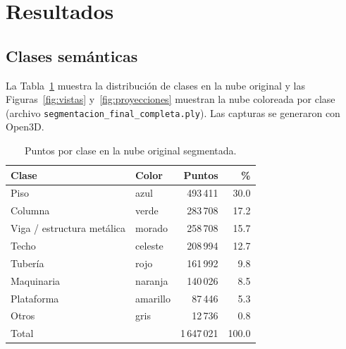 \documentclass[11pt,a4paper]{article}
\begin{document}
\section{Resultados}

\subsection{Clases semánticas}

La Tabla~\ref{tab:conteo} muestra la distribución de clases en la nube original
y las Figuras~\ref{fig:vistas} y~\ref{fig:proyecciones} muestran la nube
coloreada por clase (archivo \texttt{segmentacion\_final\_completa.ply}). Las
capturas se generaron con Open3D.

\begin{table}[H]
  \centering
  \begin{tabular}{llrr}
    \toprule
    Clase & Color & Puntos & \% \\
    \midrule
    Piso                       & azul     & 493\,411 & 30.0 \\
    Columna                    & verde    & 283\,708 & 17.2 \\
    Viga / estructura metálica & morado   & 258\,708 & 15.7 \\
    Techo                      & celeste  & 208\,994 & 12.7 \\
    Tubería                    & rojo     & 161\,992 &  9.8 \\
    Maquinaria                 & naranja  & 140\,026 &  8.5 \\
    Plataforma                 & amarillo &  87\,446 &  5.3 \\
    Otros                      & gris     &  12\,736 &  0.8 \\
    \midrule
    Total                      &          & 1\,647\,021 & 100.0 \\
    \bottomrule
  \end{tabular}
  \caption{Puntos por clase en la nube original segmentada.}
  \label{tab:conteo}
\end{table}
\end{document}
